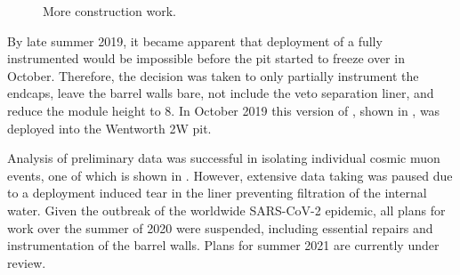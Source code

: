 \begin{figure} %
    \centering
    \quad
    \caption[More \chipsfive construction work]
    {More \chipsfive construction work.}
    \label{fig:work2}
\end{figure}

By late summer 2019, it became apparent that deployment of a fully instrumented \chipsfive would
be impossible before the pit started to freeze over in October. Therefore, the decision was taken
to only partially instrument the endcaps, leave the barrel walls bare, not include the veto
separation liner, and reduce the module height to \SI{8}{}. In October 2019 this version
of \chipsfive, shown in , was deployed into the Wentworth 2W pit.

Analysis of preliminary data was successful in isolating individual cosmic muon events, one of
which is shown in . However, extensive data taking was paused due to a
deployment induced tear in the liner preventing filtration of the internal water. Given the
outbreak of the worldwide SARS-CoV-2 epidemic, all plans for work over the summer of 2020 were
suspended, including essential repairs and instrumentation of the barrel walls. Plans for summer
2021 are currently under review.

